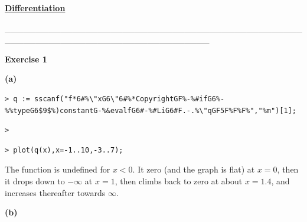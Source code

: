 \documentclass{article}
\begin{document}
\lstset{basicstyle=\ttfamily,breaklines=true,columns=flexible}
\pagestyle{empty}
\begin{center}
\begin{Maple Normal}
\underline{\textbf{Differentiation}}
\end{Maple Normal}
\end{center}
\begin{Maple Normal}
\_\_\_\_\_\_\_\_\_\_\_\_\_\_\_\_\_\_\_\_\_\_\_\_\_\_\_\_\_\_\_\_\_\_\_\_\_\_\_\_\_\_\_\_\_\_\_\_\_\_\_\_\_\_\_\_\_\_\_\_\_\_\_\_\_\_\_\_\_\_\_\_\_\_\_\_\_\_\_\_\_
\end{Maple Normal}
\begin{Maple Normal}
\textbf{Exercise 1}
\end{Maple Normal}
\begin{Maple Normal}
\textbf{(a)}
\end{Maple Normal}
\begin{lstlisting}
> q := sscanf("f*6#%\"xG6\"6#%*CopyrightGF%-%#ifG6%-%%typeG6$9$%)constantG-%&evalfG6#-%#LiG6#F.-.%\"qGF5F%F%F%","%m")[1];
\end{lstlisting}
\begin{lstlisting}
> 
\end{lstlisting}
\begin{lstlisting}
> plot(q(x),x=-1..10,-3..7);
\end{lstlisting}
\begin{Maple Normal}
The function is undefined for 
$x <0$.  It zero (and the graph is flat) at 
$x =0$, then it drops down to 
$-\infty $ at 
$x =1$, then climbs back to zero at about 
$x = 1.4$, and increases thereafter towards 
$\infty $.
\end{Maple Normal}
\begin{Maple Normal}
\textbf{(b)}
\end{Maple Normal}
\end{document}
